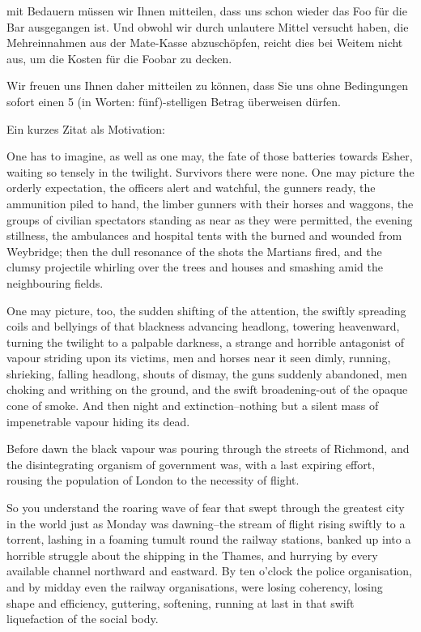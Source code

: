 \documentclass[11pt,ngerman,latin9,a4paper]{g-brief-ntz39lg22_exp}
\begin{document}
\begin{g-brief}

mit Bedauern m\"ussen wir Ihnen mitteilen, dass uns schon wieder das Foo f\"ur die Bar ausgegangen ist. Und obwohl wir durch unlautere Mittel versucht haben, die Mehreinnahmen aus der Mate-Kasse abzusch\"opfen, reicht dies bei Weitem nicht aus, um die Kosten f\"ur die Foobar zu decken.

Wir freuen uns Ihnen daher mitteilen zu k\"onnen, dass Sie uns ohne Bedingungen sofort einen 5 (in Worten: f\"unf)-stelligen Betrag \"uberweisen d\"urfen.

Ein kurzes Zitat als Motivation:

One has to imagine, as well as one may, the fate of those batteries towards Esher, waiting so tensely in the twilight.  Survivors there were none.  One may picture the orderly expectation, the officers alert and watchful, the gunners ready, the ammunition piled to hand, the limber gunners with their horses and waggons, the groups of civilian spectators standing as near as they were permitted, the evening stillness, the ambulances and hospital tents with the burned and wounded from Weybridge; then the dull resonance of the shots the Martians fired, and the clumsy projectile whirling over the trees and houses and smashing amid the neighbouring fields.

One may picture, too, the sudden shifting of the attention, the swiftly spreading coils and bellyings of that blackness advancing headlong, towering heavenward, turning the twilight to a palpable darkness, a strange and horrible antagonist of vapour striding upon its victims, men and horses near it seen dimly, running, shrieking, falling headlong, shouts of dismay, the guns suddenly abandoned, men choking and writhing on the ground, and the swift broadening-out of the opaque cone of smoke.  And then night and extinction--nothing but a silent mass of impenetrable vapour hiding its dead.

Before dawn the black vapour was pouring through the streets of Richmond, and the disintegrating organism of government was, with a last expiring effort, rousing the population of London to the necessity of flight.

So you understand the roaring wave of fear that swept through the greatest city in the world just as Monday was dawning--the stream of flight rising swiftly to a torrent, lashing in a foaming tumult round the railway stations, banked up into a horrible struggle about the shipping in the Thames, and hurrying by every available channel northward and eastward.  By ten o'clock the police organisation, and by midday even the railway organisations, were losing coherency, losing shape and efficiency, guttering, softening, running at last in that swift liquefaction of the social body.


\end{g-brief}
\end{document}
